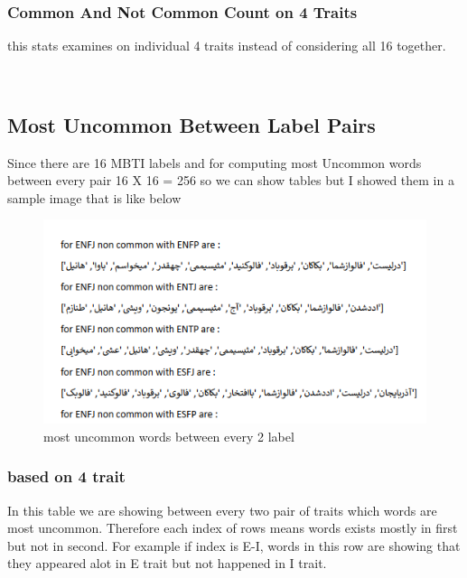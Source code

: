 \documentclass[10pt, a4paper]{article}
\newenvironment{Fa}{\begin{RTL}\faFont}{\end{RTL}}
\begin{document}
\subsubsection{Common And Not Common Count on 4 Traits}
this stats examines on individual 4 traits instead of considering all 16 together.
\\

\begin{adjustbox}{center}
\end{adjustbox}
\\
\subsection{Most Uncommon Between Label Pairs}
Since there are 16 MBTI labels and for computing most Uncommon words between every pair 16 X 16 = 256 so we can show tables but I showed them
in a sample image that is like below
\begin{figure}[H]
    \centering
    \includegraphics[width=0.7\linewidth]{../stats/most_uncommon_labels.png}
    \caption{most uncommon words between every 2 label}
\end{figure}

\subsubsection{based on 4 trait}
In this table we are showing between every two pair of traits which words are most uncommon. Therefore each index of rows means
words exists mostly in first but not in second. For example if index is E-I, words in this row are showing that they appeared alot in E trait but not happened in I trait.
\\
\begin{Fa}
    \centering
    \begin{adjustbox}{max width=0.8\textwidth}
    \end{adjustbox}
\end{Fa}
\end{document}
